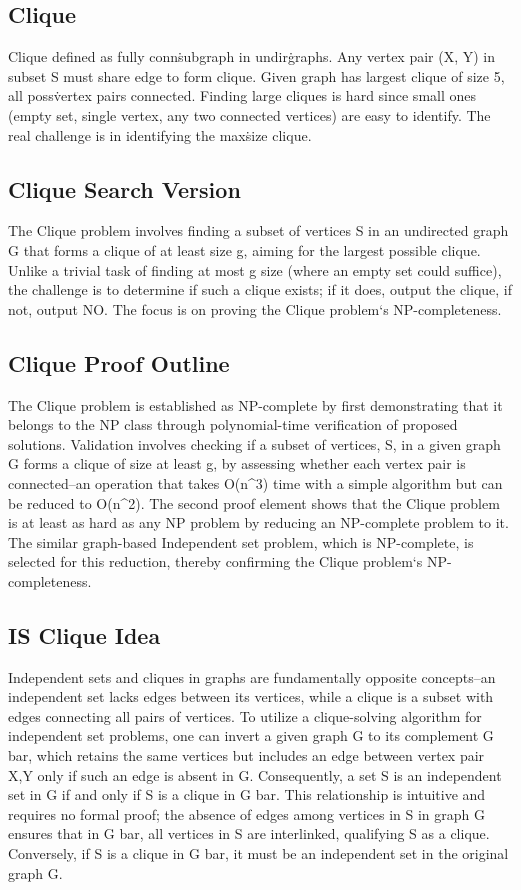 \subsection*{Clique}
Clique defined as fully conn\. subgraph in undir\. graphs.
Any vertex pair (X, Y) in subset S must share edge to form clique.
Given graph has largest clique of size 5, all poss\. vertex pairs connected.
Finding large cliques is hard since small ones (empty set, single vertex, any two connected vertices) are easy to identify.
The real challenge is in identifying the max\. size clique.

\subsection*{Clique  Search Version}
The Clique problem involves finding a subset of vertices S in an undirected graph G that forms a clique of at least size g, aiming for the largest possible clique.
Unlike a trivial task of finding at most g size (where an empty set could suffice), the challenge is to determine if such a clique exists; if it does, output the clique, if not, output NO\@.
The focus is on proving the Clique problem`s NP-completeness.

\subsection*{Clique  Proof Outline}
The Clique problem is established as NP-complete by first demonstrating that it belongs to the NP class through polynomial-time verification of proposed solutions.
Validation involves checking if a subset of vertices, S, in a given graph G forms a clique of size at least g, by assessing whether each vertex pair is connected--an operation that takes O(n\textasciicircum{}3) time with a simple algorithm but can be reduced to O(n\textasciicircum{}2).
The second proof element shows that the Clique problem is at least as hard as any NP problem by reducing an NP-complete problem to it.
The similar graph-based Independent set problem, which is NP-complete, is selected for this reduction, thereby confirming the Clique problem`s NP-completeness.

\subsection*{IS Clique Idea}
Independent sets and cliques in graphs are fundamentally opposite concepts--an independent set lacks edges between its vertices, while a clique is a subset with edges connecting all pairs of vertices.
To utilize a clique-solving algorithm for independent set problems, one can invert a given graph G to its complement G bar, which retains the same vertices but includes an edge between vertex pair X,Y only if such an edge is absent in G\@.
Consequently, a set S is an independent set in G if and only if S is a clique in G bar.
This relationship is intuitive and requires no formal proof; the absence of edges among vertices in S in graph G ensures that in G bar, all vertices in S are interlinked, qualifying S as a clique.
Conversely, if S is a clique in G bar, it must be an independent set in the original graph G\@.

